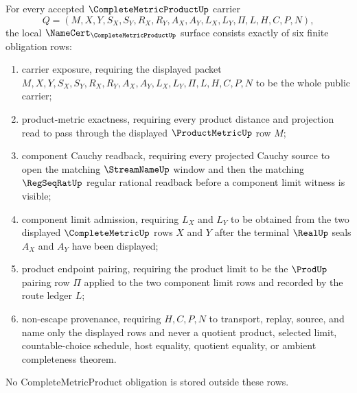\begin{theorem}
\label{thm:complete-metric-product-namecert-obligations}
For every accepted $\CompleteMetricProductUp$ carrier
$$
Q=(M,X,Y,S_X,S_Y,R_X,R_Y,A_X,A_Y,L_X,L_Y,\Pi,L,H,C,P,N),
$$
the local $\NameCert_{\CompleteMetricProductUp}$ surface consists exactly of
six finite obligation rows:
\begin{enumerate}
\item carrier exposure, requiring the displayed packet
$M,X,Y,S_X,S_Y,R_X,R_Y,A_X,A_Y,L_X,L_Y,\Pi,L,H,C,P,N$ to be the whole public
carrier;
\item product-metric exactness, requiring every product distance and
projection read to pass through the displayed $\ProductMetricUp$ row $M$;
\item component Cauchy readback, requiring every projected Cauchy source to
open the matching $\StreamNameUp$ window and then the matching $\RegSeqRatUp$
regular rational readback before a component limit witness is visible;
\item component limit admission, requiring $L_X$ and $L_Y$ to be obtained
from the two displayed $\CompleteMetricUp$ rows $X$ and $Y$ after the terminal
$\RealUp$ seals $A_X$ and $A_Y$ have been displayed;
\item product endpoint pairing, requiring the product limit to be the
$\ProdUp$ pairing row $\Pi$ applied to the two component limit rows and
recorded by the route ledger $L$;
\item non-escape provenance, requiring $H,C,P,N$ to transport, replay,
source, and name only the displayed rows and never a quotient product,
selected limit, countable-choice schedule, host equality, quotient equality,
or ambient completeness theorem.
\end{enumerate}
No CompleteMetricProduct obligation is stored outside these rows.
\end{theorem}

